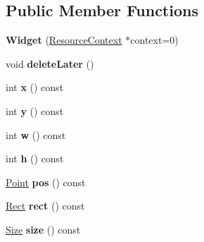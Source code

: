 \subsection*{Public Member Functions}
\begin{DoxyCompactItemize}
\item 
\hypertarget{class_tempest_1_1_widget_adad9b3bd117d3281850b34c1330d52a7}{{\bfseries Widget} (\hyperlink{class_tempest_1_1_resource_context}{Resource\+Context} $\ast$context=0)}\label{class_tempest_1_1_widget_adad9b3bd117d3281850b34c1330d52a7}

\item 
\hypertarget{class_tempest_1_1_widget_a3991766e576be8ff3113533b85c1e28e}{void {\bfseries delete\+Later} ()}\label{class_tempest_1_1_widget_a3991766e576be8ff3113533b85c1e28e}

\item 
\hypertarget{class_tempest_1_1_widget_a05df73e73d377a2bffa4c3f495c92006}{int {\bfseries x} () const }\label{class_tempest_1_1_widget_a05df73e73d377a2bffa4c3f495c92006}

\item 
\hypertarget{class_tempest_1_1_widget_abeed9d5bcebed6d6609865a66a9dee9f}{int {\bfseries y} () const }\label{class_tempest_1_1_widget_abeed9d5bcebed6d6609865a66a9dee9f}

\item 
\hypertarget{class_tempest_1_1_widget_a428ec858d71b3251129b2bbffb935181}{int {\bfseries w} () const }\label{class_tempest_1_1_widget_a428ec858d71b3251129b2bbffb935181}

\item 
\hypertarget{class_tempest_1_1_widget_addf5a07b03364f8cc7f6fe94b1e07f99}{int {\bfseries h} () const }\label{class_tempest_1_1_widget_addf5a07b03364f8cc7f6fe94b1e07f99}

\item 
\hypertarget{class_tempest_1_1_widget_a019c50b23932ff41c7f79fe03c4d01e3}{\hyperlink{struct_tempest_1_1_point}{Point} {\bfseries pos} () const }\label{class_tempest_1_1_widget_a019c50b23932ff41c7f79fe03c4d01e3}

\item 
\hypertarget{class_tempest_1_1_widget_ae847e49fde8a95c0bf4ceb47e6fd0ee6}{\hyperlink{struct_tempest_1_1_rect}{Rect} {\bfseries rect} () const }\label{class_tempest_1_1_widget_ae847e49fde8a95c0bf4ceb47e6fd0ee6}

\item 
\hypertarget{class_tempest_1_1_widget_a6196b8000cffef13fcf0b2e06a2fc905}{\hyperlink{struct_tempest_1_1_size}{Size} {\bfseries size} () const }\label{class_tempest_1_1_widget_a6196b8000cffef13fcf0b2e06a2fc905}


\end{DoxyCompactItemize}
